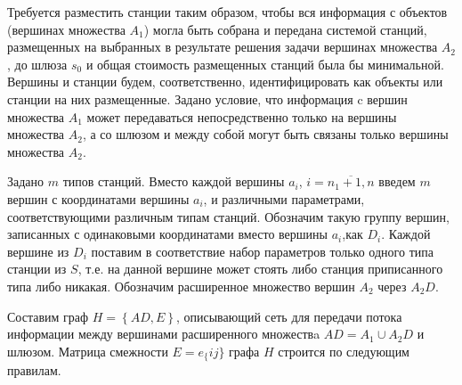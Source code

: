 


Требуется разместить станции таким образом, чтобы вся информация с объектов (вершинах множества $A_1$) могла быть собрана и передана системой станций, размещенных на выбранных в результате решения задачи вершинах множества  $A_2$, до шлюза $s_0$ и общая стоимость размещенных станций была бы минимальной.
Вершины и станции будем, соответственно, идентифицировать как объекты или станции на них размещенные.
Задано условие, что информация c вершин множества $A_1$ может передаваться непосредственно только на вершины множества $A_2$, а со шлюзом и между собой могут быть связаны только вершины множества $A_2$.

Задано $m$ типов станций. Вместо каждой вершины $a_i$, $i= \overline{n_1+1,n}$ введем $m$ вершин с координатами вершины $a_i$, и различными параметрами, соответствующими различным типам станций. Обозначим такую группу вершин, записанных с одинаковыми координатами вместо вершины $a_i$,как $D_i$. Каждой вершине из $D_i$ поставим в соответствие набор параметров только одного типа станции из $S$, т.е. на данной вершине может стоять либо станция приписанного типа либо никакая. Обозначим расширенное множество вершин $A_2$ через $A_2D$.

Составим граф $H=\left\{AD,E\right\}$, описывающий сеть для передачи потока информации между вершинами расширенного множествa $AD=A_1 \cup A_2D$ и шлюзом.
Матрица смежности $E = e_\{ij\}$ графа $H$ строится по следующим правилам.

